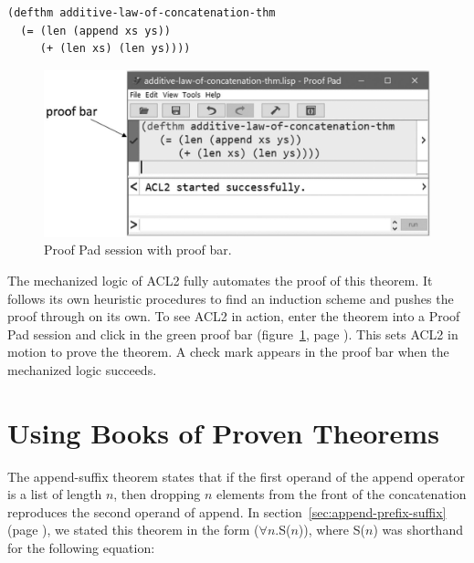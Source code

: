 \begin{code}
\begin{verbatim}
(defthm additive-law-of-concatenation-thm
  (= (len (append xs ys))
     (+ (len xs) (len ys))))
\end{verbatim}
\end{code}

\begin{figure}
\begin{center}
\includegraphics[scale=1]{images-cmyk/additive-law-of-concatenation-thm-acl2-prf-bw}
\end{center}
\caption{Proof Pad session with proof bar.}
\label{fig:proof-bar-with-chk}
\end{figure}

The mechanized logic of ACL2 fully automates the proof of this theorem.
It follows its own heuristic procedures to find an induction scheme
and pushes the proof through on its own.
To see ACL2 in action, enter the theorem into a Proof Pad session
and click in the green proof bar
(figure~\ref{fig:proof-bar-with-chk}, page \pageref{fig:proof-bar-with-chk}).
This sets ACL2 in motion to prove the theorem.
A check mark appears in the proof bar
when the mechanized logic succeeds.

\section{Using Books of Proven Theorems}
\label{sec:using-books-of-proven-theorems}

The append-suffix theorem states that
if the first operand of the \textsf{append} operator is a list of length $n$,
then dropping $n$ elements from the front of the concatenation
reproduces the second operand of \textsf{append}.
In section~\ref{sec:append-prefix-suffix} (page \pageref{append-suffix-thm-pencil-proof}),
we stated this theorem in the form ($\forall$$n$.S($n$)),
where S($n$) was shorthand for the following equation:

